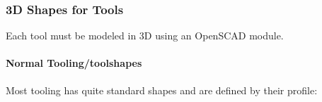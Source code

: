 \documentclass{ltxdoc}
\begin{document}
\subsubsection{3D Shapes for Tools}

Each tool must be modeled in 3D using an OpenSCAD module. 

\begin{samepage}
\paragraph{Normal Tooling/toolshapes}

\label{para:normaltooling} Most tooling has quite standard shapes 
and are defined by their profile:


\end{samepage}
\end{document}
